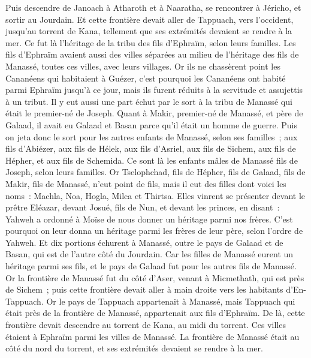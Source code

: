 \begin{multicols}{2}
Puis descendre de Janoach à Atharoth et à Naaratha, se rencontrer à Jéricho, et sortir au Jourdain.
Et cette frontière devait aller de Tappuach, vers l'occident, jusqu'au torrent de Kana, tellement que ses extrémités devaient se rendre à la mer. Ce fut là l'héritage de la tribu des fils d'Ephraïm, selon leurs familles.
Les fils d'Ephraïm avaient aussi des villes séparées au milieu de l'héritage des fils de Manassé, toutes ces villes, avec leurs villages.
Or ils ne chassèrent point les Cananéens qui habitaient à Guézer, c'est pourquoi les Cananéens ont habité parmi Ephraïm jusqu'à ce jour, mais ils furent réduits à la servitude et assujettis à un tribut.
\VerseOne{}Il y eut aussi une part échut par le sort à la tribu de Manassé qui était le premier-né de Joseph. Quant à Makir, premier-né de Manassé, et père de Galaad, il avait eu Galaad et Basan parce qu'il était un homme de guerre.
Puis on jeta donc le sort pour les autres enfants de Manassé, selon ses familles~; aux fils d'Abiézer, aux fils de Hélek, aux fils d'Asriel, aux fils de Sichem, aux fils de Hépher, et aux fils de Schemida. Ce sont là les enfants mâles de Manassé fils de Joseph, selon leurs familles.
Or Tselophchad, fils de Hépher, fils de Galaad, fils de Makir, fils de Manassé, n'eut point de fils, mais il eut des filles dont voici les noms~: Machla, Noa, Hogla, Milca et Thirtsa.
Elles vinrent se présenter devant le prêtre Eléazar, devant Josué, fils de Nun, et devant les princes, en disant~: Yahweh a ordonné à Moïse de nous donner un héritage parmi nos frères. C'est pourquoi on leur donna un héritage parmi les frères de leur père, selon l'ordre de Yahweh.
Et dix portions échurent à Manassé, outre le pays de Galaad et de Basan, qui est de l'autre côté du Jourdain.
Car les filles de Manassé eurent un héritage parmi ses fils, et le pays de Galaad fut pour les autres fils de Manassé.
Or la frontière de Manassé fut du côté d'Aser, venant à Micmethath, qui est près de Sichem~; puis cette frontière devait aller à main droite vers les habitants d'En-Tappuach.
Or le pays de Tappuach appartenait à Manassé, mais Tappuach qui était près de la frontière de Manassé, appartenait aux fils d'Ephraïm.
De là, cette frontière devait descendre au torrent de Kana, au midi du torrent. Ces villes étaient à Ephraïm parmi les villes de Manassé. La frontière de Manassé était au côté du nord du torrent, et ses extrémités devaient se rendre à la mer.

\end{multicols}
